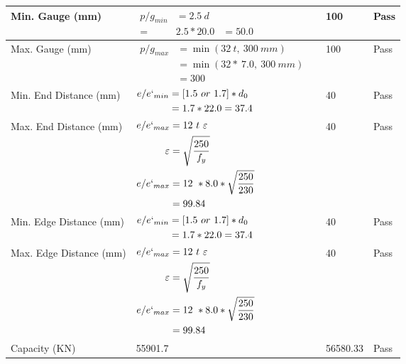 \documentclass{article}%
\begin{document}
\begin{longtable}{|p{4cm}|p{5cm}|p{5.5cm}|p{1.5cm}|}
\hline%
Min. Gauge (mm)&$\begin{aligned}p/g_{min}&= 2.5 ~ d&\\ =&2.5*20.0&=50.0\end{aligned}$&100&Pass\\%
\hline%
Max. Gauge (mm)&$\begin{aligned}p/g_{max} &=\min(32~t,~300~mm)&\\ &=\min(32 *~7.0,~ 300 ~mm)\\&=300\end{aligned}$&100&Pass\\%
\hline%
Min. End Distance (mm)&$\begin{aligned}e/e`_{min} &=[1.5~or~ 1.7] * d_0\\ &=1.7*22.0=37.4 \end{aligned}$&40&Pass\\%
\hline%
Max. End Distance (mm)&$\begin{aligned}e/e`_{max} &= 12~ t~ \varepsilon&\\ \varepsilon &= \sqrt{\frac{250}{f_y}}\\ e/e`_{max}&=12 ~*8.0*\sqrt{\frac{250}{230}}\\ &=99.84\\ \end{aligned}$&40&Pass\\%
\hline%
Min. Edge Distance (mm)&$\begin{aligned}e/e`_{min} &=[1.5~or~ 1.7] * d_0\\ &=1.7*22.0=37.4 \end{aligned}$&40&Pass\\%
\hline%
Max. Edge Distance (mm)&$\begin{aligned}e/e`_{max} &= 12~ t~ \varepsilon&\\ \varepsilon &= \sqrt{\frac{250}{f_y}}\\ e/e`_{max}&=12 ~*8.0*\sqrt{\frac{250}{230}}\\ &=99.84\\ \end{aligned}$&40&Pass\\%
\hline%
Capacity (KN)&55901.7&56580.33&Pass\\%
\hline%
\end{longtable}

%
\end{document}
